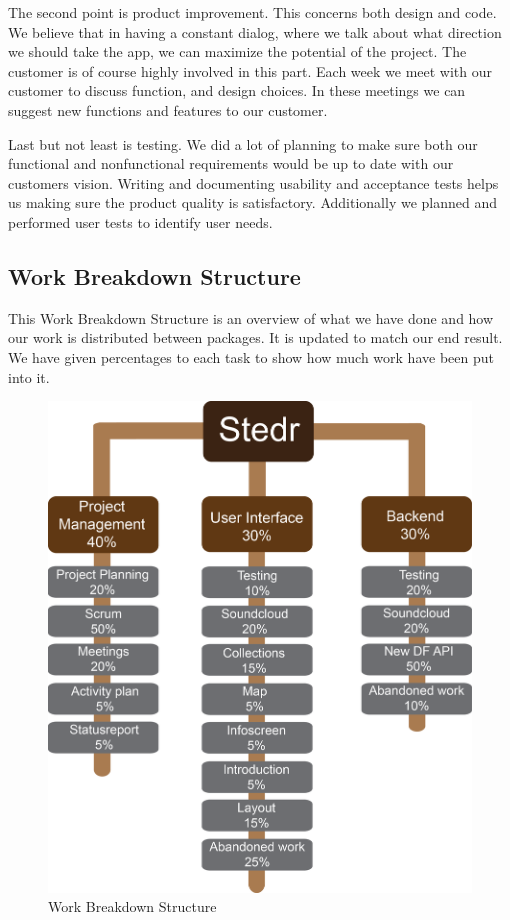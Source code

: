 The second point is product improvement. This concerns both design and code. We believe that in having a constant dialog, where we talk about what direction we should take the app, we can maximize the potential of the project. The customer is of course highly involved in this part. Each week we meet with our customer to discuss function, and design choices. In these meetings we can suggest new functions and features to our customer.

Last but not least is testing. We did a lot of planning to make sure both our functional and nonfunctional requirements would be up to date with our customers vision. Writing and documenting usability and acceptance tests helps us making sure the product quality is satisfactory. Additionally we planned and performed user tests to identify user needs. 


\subsection{Work Breakdown Structure}
This Work Breakdown Structure is an overview of what we have done and how our work is distributed between packages. It is updated to match our end result.
We have given percentages to each task to show how much work have been put into it.

\begin{figure}[h!]
\begin{center}
\includegraphics[scale=0.6]{WBS}
\caption{Work Breakdown Structure}
\end{center}
\end{figure}
\clearpage




